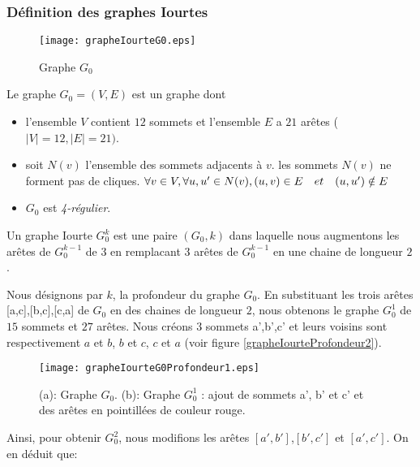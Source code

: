 \subsubsection{D\'efinition des graphes Iourtes}

\begin{figure}[htb!] 
\centering
\texttt{[image: grapheIourteG0.eps]}
\caption{Graphe $G_0 $}
\label{grapheIourteG0} 
\end{figure}

\begin{definition}
Le graphe $G_0 = (V, E)$ est un graphe dont
\begin{itemize}
	\item l'ensemble $V$ contient $12$ sommets et l'ensemble $E$ a $21$ ar\^etes ($|V| = 12, |E| = 21)$.
	\item soit $N(v)$ l'ensemble des sommets adjacents \`a $v$. 
		les sommets $N(v)$ ne forment pas de cliques. \newline
		$\forall v \in V, \forall u, u' \in N(v),  (u, v) \in E \hspace{1 em} et  \hspace{1 em} (u, u') \notin E $
	\item $G_0$ est {\em 4-r\'egulier}.
\end{itemize}
\end{definition}

\begin{definition}
Un graphe Iourte $G_0^k$ est une paire $(G_0, k)$ dans laquelle nous  augmentons les ar\^etes de $G_0^{k-1}$ de $3$ en remplacant  $3$ ar\^etes de $G_0^{k-1}$ en une chaine de longueur $2$.
\end{definition}
Nous d\'esignons par $k$, la profondeur du graphe $G_0$.
En substituant  les trois ar\^etes [a,c],[b,c],[c,a] de $G_0$ en des chaines de longueur $2$, nous obtenons le graphe  $G_0^1$ de $15$ sommets et $27$ ar\^etes. 
Nous cr\'eons $3$ sommets a',b',c' et leurs voisins sont respectivement $a$ et $b$, $b$ et $c$, $c$ et $a$ (voir figure \ref{grapheIourteProfondeur2}).
\begin{figure}[htb!] 
\centering
\texttt{[image: grapheIourteG0Profondeur1.eps]}
\caption{ (a): Graphe $G_0$. (b): Graphe $G_0^1 $ : ajout de sommets a', b' et c'  et des ar\^etes en pointill\'ees de couleur rouge.}
\label{grapheIourteG0Profondeur1} 
\end{figure}
\newline
Ainsi, pour obtenir $G_0^2$, nous modifions les ar\^etes $[a',b']$,$[b',c']$ et $[a',c']$. On en d\'eduit que:

